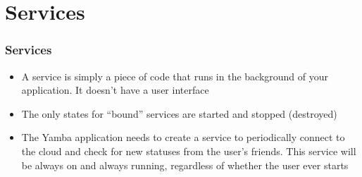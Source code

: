 
\section{Services}
\begin{frame}
\frametitle{Services}
\begin{itemize}
\item A \alert{service} is simply a piece of code that runs in the background of your application. It doesn’t have a user interface
\item The only states for ``bound'' services are started and stopped (destroyed)
\item The Yamba application needs to create a service to periodically
connect to the cloud and check for new statuses from the user’s friends. This
service will be always on and always running, regardless of whether the user ever starts
\end{itemize}
\end{frame}
